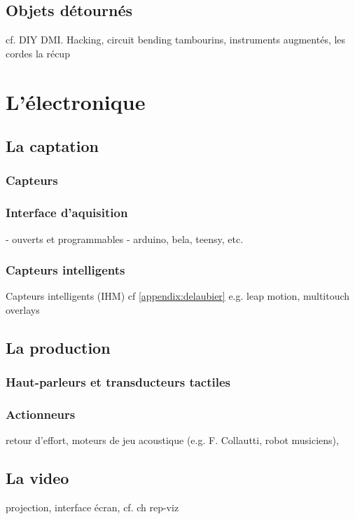\subsection{Objets détournés}
cf. DIY DMI. Hacking, circuit bending
tambourins, instruments augmentés, les cordes
la récup
\section{L'électronique}
\label{sec:interfaces:materials}
\subsection{La captation}
\subsubsection{Capteurs}

\subsubsection{Interface d'aquisition}
	- ouverts et programmables
		- arduino, bela, teensy, etc.
\subsubsection{Capteurs intelligents}
	Capteurs intelligents (IHM)
	cf \ref{appendix:delaubier}
	e.g. leap motion, multitouch overlays
	
\subsection{La production}
\subsubsection{Haut-parleurs et transducteurs tactiles}
\subsubsection{Actionneurs}
retour d'effort, moteurs de jeu acoustique (e.g. F. Collautti, robot musiciens), 
\subsection{La video}
projection, interface écran, cf. ch rep-viz



